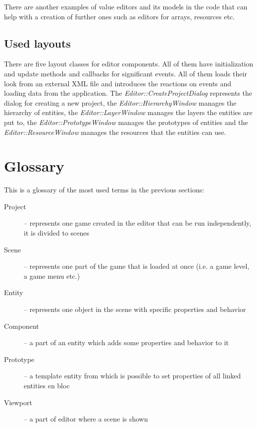 There are another examples of value editors and its models in the code that can help with a creation of further ones such as editors for arrays, resources etc.

\subsection{Used layouts}

There are five layout classes for editor components. All of them have initialization and update methods and callbacks for significant events. All of them loads their look from an external XML file and introduces the reactions on events and loading data from the application. The \emph{Editor::Create\-Project\-Dialog} represents the dialog for creating a new project, the \emph{Editor\-::\-Hierarchy\-Window} manages the hierarchy of entities, the \emph{Editor\-::\-Layer\-Window} manages the layers the entities are put to, the \emph{Editor\-::\-Prototype\-Window} manages the prototypes of entities and the \emph{Editor\-::\-Resource\-Window} manages the resources that the entities can use.

\section{Glossary}
This is a glossary of the most used terms in the previous sections:

\begin{description}
  \item[Project] -- represents one game created in the editor that can be run independently, it is divided to scenes
  \item[Scene] -- represents one part of the game that is loaded at once (i.e. a game level, a game menu etc.)
  \item[Entity] -- represents one object in the scene with specific properties and behavior
  \item[Component] -- a part of an entity which adds some properties and behavior to it
  \item[Prototype] -- a template entity from which is possible to set properties of all linked entities en bloc
  \item[Viewport] -- a part of editor where a scene is shown
\end{description}